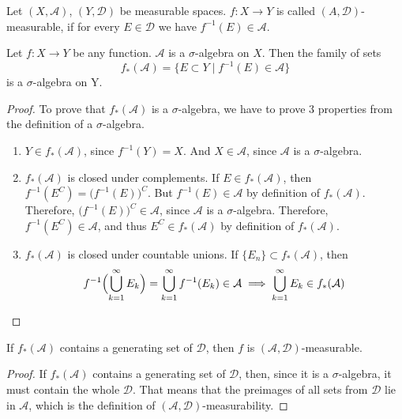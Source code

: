\begin{definition}
    Let $(X, \mathcal{A})$, $(Y, \mathcal{D})$ be measurable spaces.
    $f : X \to Y$ is called $(A, \mathcal{D})$-measurable, if
    for every $E \in \mathcal{D}$ we have $f^{-1}(E) \in \mathcal{A}$.
\end{definition}
\begin{proposition}
    Let $f: X \to Y$ be any function. $\mathcal{A}$ is a $\sigma$-algebra on $X$.
    Then the family of sets
    \[ f_*(\mathcal{A}) = \{E \subset Y \mid f^{-1}(E) \in \mathcal{A} \} \]
    is a $\sigma$-algebra on Y.
\end{proposition}
\begin{proof}
    To prove that $f_*(\mathcal{A})$ is a $\sigma$-algebra, we have to prove 3
    properties from the definition of a $\sigma$-algebra.
    \begin{enumerate}
        \item {
            $Y \in f_*(\mathcal{A})$, since $f^{-1}(Y) = X$.
            And $X \in \mathcal{A}$, since $\mathcal{A}$ is a $\sigma$-algebra.
        }
        \item {
            $f_*(\mathcal{A})$ is closed under complements.
            If $E \in f_*(\mathcal{A})$, then
            $f^{-1}(E^C) = \bigl(f^{-1}(E)\bigr)^C$.
            But $f^{-1}(E) \in \mathcal{A}$ by definition of $f_*(\mathcal{A})$.
            Therefore, $\bigl(f^{-1}(E)\bigr)^C \in \mathcal{A}$, since $\mathcal{A}$ is a $\sigma$-algebra.
            Therefore, $f^{-1}(E^C) \in \mathcal{A}$, and thus $E^C \in f_*(\mathcal{A})$
            by definition of $f_*(\mathcal{A})$.
        }
        \item {
            $f_*(\mathcal{A})$ is closed under countable unions.
            If $\{E_n\} \subset f_*(\mathcal{A})$, then 
            \[
                f^{-1}\Bigl(\bigcup_{k=1}^\infty E_k\Bigr) = 
                \bigcup_{k=1}^\infty f^{-1}(E_k) \in \mathcal{A} \implies
                \bigcup_{k=1}^\infty E_k \in f_*(\mathcal{A})
            \]
        }
    \end{enumerate}
\end{proof}
\begin{observation}
    If $f_*(\mathcal{A})$ contains a generating set of $\mathcal{D}$, then
    $f$ is $(\mathcal{A}, \mathcal{D})$-measurable.
\end{observation}
\begin{proof}
    If $f_*(\mathcal{A})$ contains a generating set of $\mathcal{D}$, then, 
    since it is a $\sigma$-algebra, it must contain the whole $\mathcal{D}$. That 
    means that the preimages of all sets from $\mathcal{D}$ lie in 
    $\mathcal{A}$, which is the definition of $(\mathcal{A}, \mathcal{D})$-measurability.
\end{proof}

